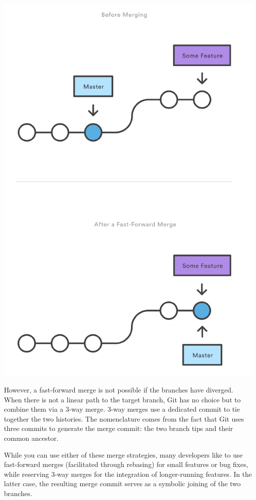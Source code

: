 \documentclass{article}
\begin{document}
\begin{center}
\includegraphics[scale=0.5]{figures/10.pdf}
\end{center}

However, a fast-forward merge is not possible if the branches have
diverged. When there is not a linear path to the target branch, Git
has no choice but to combine them via a 3-way merge. 3-way merges use
a dedicated commit to tie together the two histories. The nomenclature
comes from the fact that Git uses three commits to generate the merge
commit: the two branch tips and their common ancestor. 

While you can use either of these merge strategies, many developers
like to use fast-forward merges (facilitated through rebasing) for
small features or bug fixes, while reserving 3-way merges for the
integration of longer-running features. In the latter case, the
resulting merge commit serves as a symbolic joining of the two
branches. 
\end{document}
